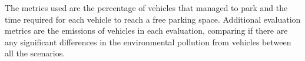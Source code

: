 
The metrics used are the percentage of vehicles that managed to park and the time required for each vehicle to reach a free parking space. Additional evaluation metrics are the emissions of vehicles in each evaluation, comparing if there are any significant differences in the environmental pollution from vehicles between all the scenarios.